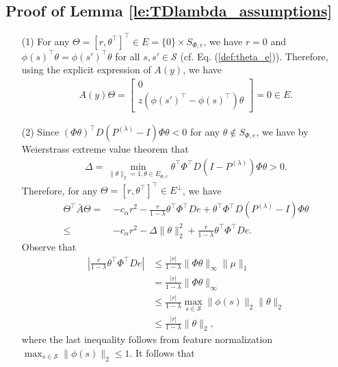 \documentclass[11 pt]{article}
\begin{document}
	\subsection{Proof of Lemma \ref{le:TDlambda_assumptions}}\label{pf:le:TDlambda_assumptions}
	\begin{enumerate}
		\item [(1)] For any $\Theta=[r,\theta^\top ]^\top \in E=\{0\}\times S_{\Phi,e}$, we have $r=0$ and $\phi(s)^\top \theta=\phi(s')^\top \theta$ for all $s,s'\in\mathcal{S}$ (cf. Eq. (\ref{def:theta_e})). Therefore, using the explicit expression of $A(y)$, we have
		\begin{align*}
			A(y)\Theta=\begin{bmatrix}
				0\\
				z(\phi(s')^\top -\phi(s)^\top )\theta
			\end{bmatrix}=0\in E.
		\end{align*}
		\item [(2)] Since $(\Phi \theta)^\top D (P^{(\lambda)} - I )\Phi \theta<0$ \cite[Lemma 7]{tsitsiklis1999average} for any $\theta \notin S_{\Phi,e}$, we have by Weierstrass extreme value theorem that
		\begin{align*}
			\Delta=\min_{\|\theta\|_2=1, \theta\in E_{\Phi, e}} \theta^\top\Phi^\top D ( I - P^{(\lambda)} )\Phi\theta>0.
		\end{align*}
		Therefore, for any $\Theta=[r,\theta^\top]^\top  \in E^\perp$, we have
		\begin{align*}
			\Theta^\top \bar{A}\Theta=\,&-c_{\alpha}r^2-\frac{r}{1-\lambda}\theta^\top\Phi^\top De+\theta^\top \Phi^\top D(  P^{(\lambda)} -I)\Phi\theta\\
			\leq \,&-c_{\alpha}r^2-\Delta\|\theta\|_2^2+\frac{r}{1-\lambda}\theta^\top\Phi^\top De.
		\end{align*}
		Observe that 
		\begin{align*}
			\left|\frac{r}{1-\lambda}\theta^\top \Phi^\top De\right|
			&\leq \frac{|r|}{1-\lambda}\|\Phi\theta\|_{\infty}\|\mu\|_1\\
			&= \frac{|r|}{1-\lambda}\|\Phi\theta\|_{\infty}\\
			&\leq \frac{|r|}{1-\lambda}\max_{s\in \mathcal{S}}\|\phi(s)\|_2\|\theta\|_2\\
			&\leq \frac{|r|}{1-\lambda}\|\theta\|_2,
		\end{align*}
		where the last inequality follows from feature normalization $\max_{s\in\mathcal{S}}\|\phi(s)\|_2\leq 1$. It follows that
		\begin{align}

\end{align}
\end{enumerate}
\end{document}
